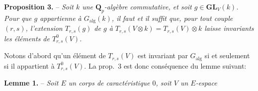 \textbf{Proposition 3.} -- \textit{Soit $k$ une $\mathbf{Q}_p$-algèbre commutative, et soit $g\in\mathbf{GL}_V(k)$. Pour que $g$ appartienne à $G_{\mathrm{alg}}(k)$, il faut et il suffit que, pour tout couple $(r,s)$, l’extension $T_{r,s}(g)$ de $g$ à $T_{r,s}(V\otimes k)=T_{r,s}(V)\otimes k$ laisse invariants les éléments de $T^0_{r,s}(V)$.}

Notons d’abord qu’un élément de $T_{r,s}(V)$ est invariant par $G_{\mathrm{alg}}$ si et seulement si il appartient à $T^0_{r,s}(V)$. La prop.~3 est donc conséquence du lemme suivant:

\textbf{Lemme 1.} -- \textit{Soit $E$ un corps de caractéristique $0$, soit $V$ un $E$-espace}

